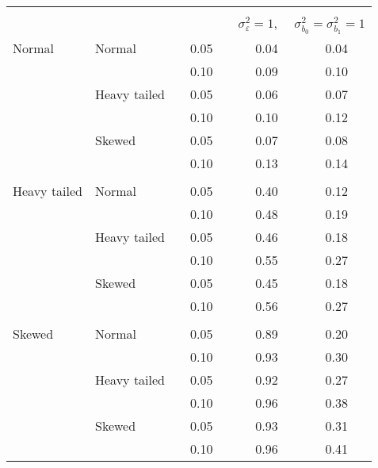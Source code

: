 \begin{table}[ht]
\begin{center}
\begin{scriptsize}
\begin{tabular}{ll p{.1cm} c p{.1cm} cc}
&&&&&&\\             
  & && && \multicolumn{2}{c}{$\sigma_{\varepsilon}^2 = 1$, \ \ $\sigma_{b_0}^2 = \sigma_{b_1}^2 = 1$} \\ \cline{6-7}
\rowcolor{gray!20}Normal       & Normal       && 0.05 &&  0.04 & 0.04 \\ 
\rowcolor{gray!20}             &              && 0.10 &&  0.09 & 0.10 \\ 
\rowcolor{gray!20}             & Heavy tailed && 0.05 &&  0.06 & 0.07 \\ 
\rowcolor{gray!20}             &              && 0.10 &&  0.10 & 0.12 \\ 
\rowcolor{gray!20}             & Skewed       && 0.05 &&  0.07 & 0.08 \\ 
\rowcolor{gray!20}             &              && 0.10 &&  0.13 & 0.14 \\ 
             &&&&&&\\
Heavy tailed & Normal       && 0.05 &&  0.40 & 0.12 \\ 
             &              && 0.10 &&  0.48 & 0.19 \\ 
             & Heavy tailed && 0.05 &&  0.46 & 0.18 \\ 
             &              && 0.10 &&  0.55 & 0.27 \\ 
             & Skewed       && 0.05 &&  0.45 & 0.18 \\ 
             &              && 0.10 &&  0.56 & 0.27 \\ 
             &&&&&&\\
Skewed       & Normal       && 0.05 &&  0.89 & 0.20 \\ 
             &              && 0.10 &&  0.93 & 0.30 \\ 
             & Heavy tailed && 0.05 &&  0.92 & 0.27 \\ 
             &              && 0.10 &&  0.96 & 0.38 \\ 
             & Skewed       && 0.05 &&  0.93 & 0.31 \\ 
             &              && 0.10 &&  0.96 & 0.41 \\ 


\end{tabular}
\end{scriptsize}
\end{center}
\end{table}
